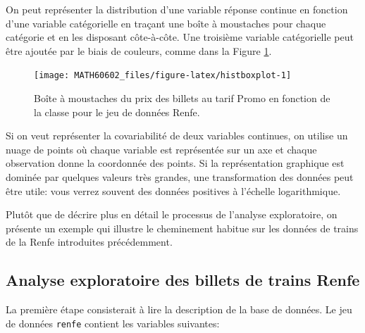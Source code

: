 \documentclass[
  11pt,
  letterpaper,
]{book}
\theoremstyle{definition}
\theoremstyle{definition}
\theoremstyle{definition}
\theoremstyle{definition}
\theoremstyle{remark}
\begin{document}
On peut représenter la distribution d'une variable réponse continue en fonction d'une variable catégorielle en traçant une boîte à moustaches pour chaque catégorie et en les disposant côte-à-côte. Une troisième variable catégorielle peut être ajoutée par le biais de couleurs, comme dans la Figure \ref{fig:histboxplot}.

\begin{figure}

{\centering \texttt{[image: MATH60602\_files/figure-latex/histboxplot-1]} 

}

\caption{Boîte à moustaches du prix des billets au tarif Promo en fonction de la classe pour le jeu de données Renfe.}\label{fig:histboxplot}
\end{figure}

Si on veut représenter la covariabilité de deux variables continues, on utilise un nuage de points où chaque variable est représentée sur un axe et chaque observation donne la coordonnée des points. Si la représentation graphique est dominée par quelques valeurs très grandes, une transformation des données peut être utile: vous verrez souvent des données positives à l'échelle logarithmique.

Plutôt que de décrire plus en détail le processus de l'analyse exploratoire, on présente un exemple qui illustre le cheminement habitue sur les données de trains de la Renfe introduites précédemment.

\hypertarget{analyse-exploratoire-des-billets-de-trains-renfe}{%
\subsection{Analyse exploratoire des billets de trains Renfe}\label{analyse-exploratoire-des-billets-de-trains-renfe}}

La première étape consisterait à lire la description de la base de données. Le jeu de données \texttt{renfe} contient les variables suivantes:
\end{document}
